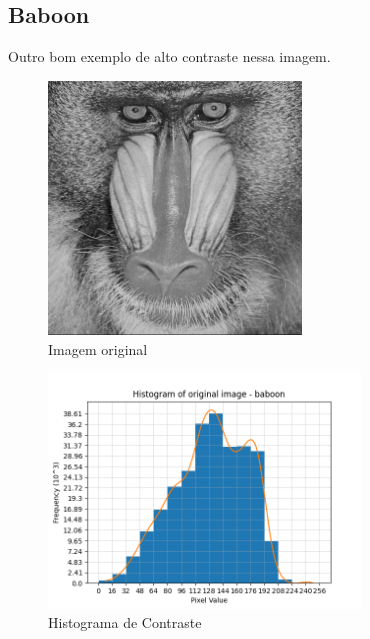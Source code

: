 \documentclass[12pt, letterpaper]{article}
\begin{document}
    \subsection{Baboon}
        Outro bom exemplo de alto contraste nessa imagem.
        \begin{figure}[H]
            \label{hist:baboon}
            \centering
            \includegraphics[width=0.6\textwidth]{baboon.png}
            \\{Imagem original}

            \includegraphics[width=0.74\textwidth]{baboon_histogram.png}
            \\{Histograma de Contraste}
        \end{figure}
\end{document}
